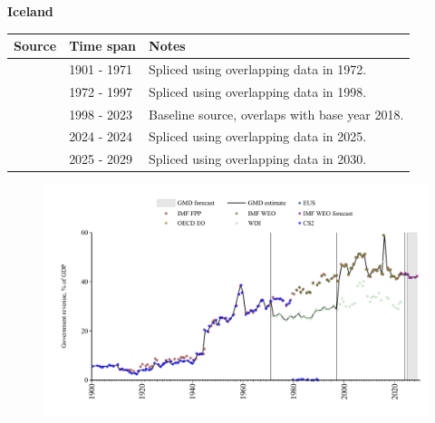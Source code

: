 \documentclass[12pt,a4paper,landscape]{article}
\begin{document}
\begin{adjustbox}{max totalsize={\paperwidth}{\paperheight},center}
\begin{minipage}[t][\textheight][t]{\textwidth}
\vspace*{0.5cm}
{}
\begin{center}
{\Large\bfseries Iceland}
\end{center}
\vspace{0.5cm}
\begin{table}[H]
\centering
\small
\begin{tabular}{|l|l|l|}
\hline
\textbf{Source} & \textbf{Time span} & \textbf{Notes} \\
\hline
\rowcolor{white}\cite{CS2_ISL}& 1901 - 1971 &Spliced using overlapping data in 1972.\\
\rowcolor{lightgray}\cite{WDI}& 1972 - 1997 &Spliced using overlapping data in 1998.\\
\rowcolor{white}\cite{OECD_EO}& 1998 - 2023 &Baseline source, overlaps with base year 2018.\\
\rowcolor{lightgray}\cite{EUS}& 2024 - 2024 &Spliced using overlapping data in 2025.\\
\rowcolor{white}\cite{IMF_WEO_forecast}& 2025 - 2029 &Spliced using overlapping data in 2030.\\
\hline
\end{tabular}
\end{table}
\begin{figure}[H]
\centering
\includegraphics[width=\textwidth,height=0.6\textheight,keepaspectratio]{graphs/ISL_govrev_GDP.pdf}
\end{figure}
\end{minipage}
\end{adjustbox}
\end{document}
